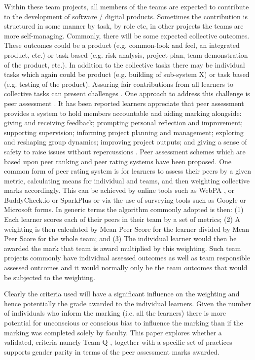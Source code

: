 \documentclass[sigconf, anonymous=true]{acmart}
\begin{document}
Within these team projects, all members of the teams are expected to contribute to the  development of software / digital products. Sometimes the contribution is structured in some manner by task, by role etc, in other projects the teams are more self-managing. Commonly, there will be some expected collective outcomes. These outcomes could be a product (e.g. common-look and feel, an integrated product, etc.) or task based (e.g. risk analysis, project plan, team demonstration of the product, etc.).  In addition to the collective tasks there may be individual tasks which again could be product (e.g. building of sub-system X) or task based (e.g. testing of the product). Assuring fair contributions from all learners to collective tasks can present challenges \cite{Philips21}. One approach to address this challenge is peer assessment \cite{Gordon2010}. It has been reported learners appreciate that peer assessment provides a system to hold members accountable and  aiding marking alongside: giving and receiving feedback; prompting personal reflection and improvement; supporting supervision; informing project planning and management; exploring and reshaping group dynamics; improving project outputs; and giving a sense of safety to raise issues without repercussions \cite{Mitchell2021}.   Peer assessment schemes which are based upon peer ranking  and peer rating systems \cite{Yanbin2005} have been proposed. One common form of peer rating system is for learners to assess their peers by a given metric, calculating means for individual and teams, and then weighting collective marks accordingly. This can be achieved by online tools such as WebPA \cite{WebPA}, or BuddyCheck.io \cite{BuddyCheck} or SparkPlus \cite{SparkPlus} or via the use of surveying tools such as Google or Microsoft forms. In generic terms the algorithm commonly adopted is then: (1) Each learner scores each of their peers in their team by a set of metrics; (2) A weighting is then calculated by Mean Peer Score for the learner divided by Mean Peer Score for the whole team; and (3) The individual learner would then be awarded the mark that team is award multiplied by this weighting. Such team projects commonly have individual assessed outcomes as well as team responsible assessed outcomes and it would normally only be the team outcomes that would be subjected to the weighting.

Clearly the criteria used will have a significant influence on the weighting and hence potentially the grade awarded to the individual learners.  Given the number of individuals who inform the marking (i.e. all the learners) there is more potential for unconscious or conscious bias to influence the marking than if the marking was completed solely by faculty. This paper explores whether a validated, criteria namely Team Q \cite{Britton2017}, together with a specific set of practices supports gender parity in terms of the peer assessment marks awarded. 
  
\end{document}
